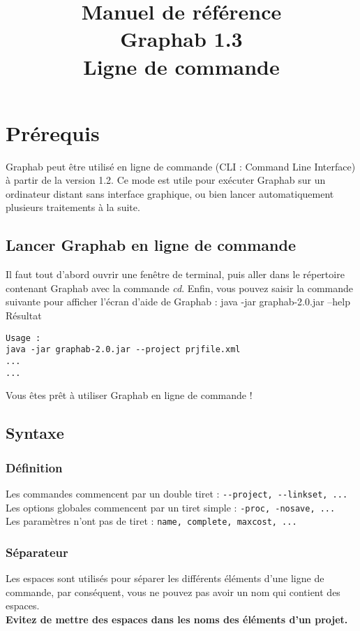 \documentclass[a4paper,10pt]{report}
\title{Manuel de référence\\
Graphab 1.3\\
Ligne de commande}
\newenvironment{cmd}
{\quote\Verbatim}
{\endVerbatim\endquote}
\begin{document}
\maketitle


\parindent 0pt

\tableofcontents

\chapter{Prérequis}

Graphab peut être utilisé en ligne de commande (CLI : Command Line Interface) à partir de la version 1.2.
Ce mode est utile pour exécuter Graphab sur un ordinateur distant sans interface graphique, ou bien lancer automatiquement plusieurs traitements à la suite.

\section{Lancer Graphab en ligne de commande}
Il faut tout d'abord ouvrir une fenêtre de terminal, puis aller dans le répertoire contenant Graphab avec la commande \textit{cd}.
Enfin, vous pouvez saisir la commande suivante pour afficher l'écran d'aide de Graphab :
\begin{cmd}
java -jar graphab-2.0.jar --help
\end{cmd}
Résultat
\begin{verbatim}
Usage :
java -jar graphab-2.0.jar --project prjfile.xml
...
...
\end{verbatim}
Vous êtes prêt à utiliser Graphab en ligne de commande !

\section{Syntaxe}
\subsection{Définition}
Les commandes commencent par un double tiret : \verb|--project, --linkset, ...|\\
Les options globales commencent par un tiret simple : \verb|-proc, -nosave, ...|\\
Les paramètres n'ont pas de tiret : \verb|name, complete, maxcost, ...|
\subsection{Séparateur}
Les espaces sont utilisés pour séparer les différents éléments d'une ligne de commande, par conséquent, vous ne pouvez pas avoir un nom qui contient des espaces.\\
\textbf{Evitez de mettre des espaces dans les noms des éléments d'un projet.}
\end{document}
